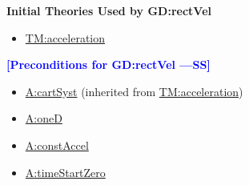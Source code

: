 \documentclass[12pt]{article}
\newcommand{\authornote}[3]{\textcolor{#1}{[#3 ---#2]}}
\newcommand{\authornote}[3]{}
\newcommand{\wss}[1]{\authornote{blue}{SS}{#1}}
\begin{document}
\noindent \textbf{Initial Theories Used by GD:rectVel}

\begin{itemize}
\item \hyperref[TM:acceleration]{TM:acceleration}
\end{itemize}

\noindent \textbf{\wss{Preconditions for GD:rectVel}}

\begin{itemize}
\item \hyperref[cartSyst]{A:cartSyst} (inherited from \hyperref[TM:acceleration]{TM:acceleration})
\item \hyperref[oneD]{A:oneD}
\item \hyperref[constAccel]{A:constAccel}
\item \hyperref[timeStartZero]{A:timeStartZero}
\end{itemize}
\end{document}
